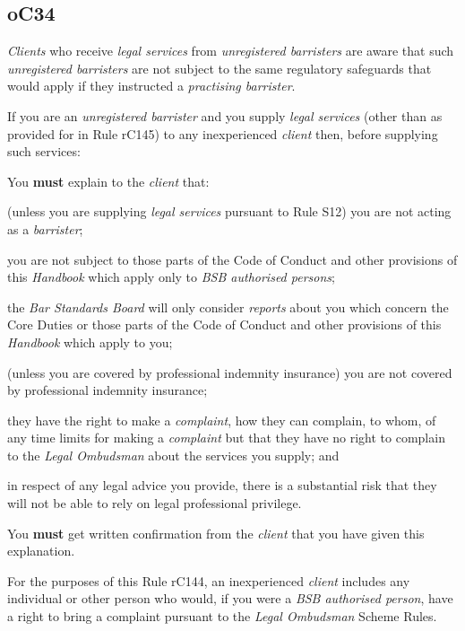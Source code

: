 

\subsection{\color{bleu}oC34}

\emph{Clients} who receive \emph{legal services} from \emph{unregistered
barristers} are aware that such \emph{unregistered barristers} are not
subject to the same regulatory safeguards that would apply if they
instructed a \emph{practising barrister}.




If you are an \emph{unregistered barrister} and you supply \emph{legal
services} (other than as provided for in Rule rC145) to any
inexperienced \emph{client} then, before supplying such services:
\begin{numlist}\item You \textcolor{myred}{\textbf{must}} explain to the \emph{client} that:
\begin{alphlist}\item (unless you are supplying \emph{legal services} pursuant to Rule S12)
you are not acting as a \emph{barrister};
\item you are not subject to those parts of the Code of Conduct and other
provisions of this \emph{Handbook} which apply only to \emph{BSB
authorised persons};
\item the \emph{Bar Standards Board} will only consider \emph{reports}
about you which concern the Core Duties or those parts of the Code of
Conduct and other provisions of this \emph{Handbook} which apply to you;
\item (unless you are covered by professional indemnity insurance) you are
not covered by professional indemnity insurance;
\item they have the right to make a \emph{complaint}, how they can
complain, to whom, of any time limits for making a \emph{complaint} but
that they have no right to complain to the \emph{Legal Ombudsman} about
the services you supply; and
\item in respect of any legal advice you provide, there is a substantial
risk that they will not be able to rely on legal professional privilege.\end{alphlist}

\item You \textcolor{myred}{\textbf{must}} get written confirmation from the \emph{client} that you
have given this explanation.

For the purposes of this Rule rC144, an inexperienced \emph{client}
includes any individual or other person who would, if you were a
\emph{BSB authorised person}, have a right to bring a complaint pursuant
to the \emph{Legal Ombudsman} Scheme Rules.

\end{numlist}



